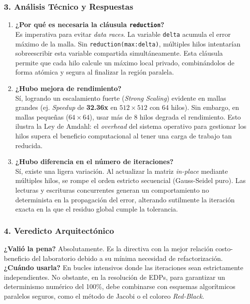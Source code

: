 \documentclass[11pt,a4paper]{article}
\begin{document}
\subsubsection*{3. Análisis Técnico y Respuestas}

\begin{enumerate}
    \item \textbf{¿Por qué es necesaria la cláusula \texttt{reduction}?} \\
    Es imperativa para evitar \textit{data races}. La variable \texttt{delta} acumula el error máximo de la malla. Sin \texttt{reduction(max:delta)}, múltiples hilos intentarían sobreescribir esta variable compartida simultáneamente. Esta cláusula permite que cada hilo calcule un máximo local privado, combinándolos de forma atómica y segura al finalizar la región paralela.

    \item \textbf{¿Hubo mejora de rendimiento?} \\
    Sí, logrando un escalamiento fuerte (\textit{Strong Scaling}) evidente en mallas grandes (ej. \textit{Speedup} de \textbf{32.36x} en $512 \times 512$ con 64 hilos). Sin embargo, en mallas pequeñas ($64 \times 64$), usar más de 8 hilos degrada el rendimiento. Esto ilustra la Ley de Amdahl: el \textit{overhead} del sistema operativo para gestionar los hilos supera el beneficio computacional al tener una carga de trabajo tan reducida.

    \item \textbf{¿Hubo diferencia en el número de iteraciones?} \\
    Sí, existe una ligera variación. Al actualizar la matriz \textit{in-place} mediante múltiples hilos, se rompe el orden estricto secuencial (Gauss-Seidel puro). Las lecturas y escrituras concurrentes generan un comportamiento no determinista en la propagación del error, alterando sutilmente la iteración exacta en la que el residuo global cumple la tolerancia.
\end{enumerate}

\subsubsection*{4. Veredicto Arquitectónico}
\textbf{¿Valió la pena?} Absolutamente. Es la directiva con la mejor relación costo-beneficio del laboratorio debido a su mínima necesidad de refactorización. \textbf{¿Cuándo usarla?} En bucles intensivos donde las iteraciones sean estrictamente independientes. No obstante, en la resolución de EDPs, para garantizar un determinismo numérico del 100\%, debe combinarse con esquemas algorítmicos paralelos seguros, como el método de Jacobi o el coloreo \textit{Red-Black}.
\end{document}
